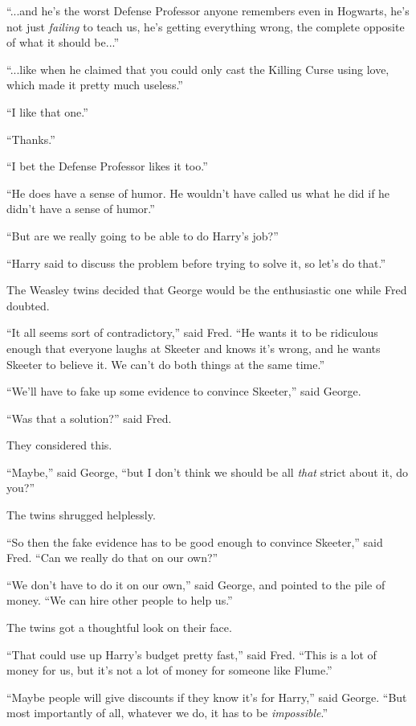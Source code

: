 ``...and he's the worst Defense Professor anyone remembers even in Hogwarts, he's not just \emph{failing} to teach us, he's getting everything wrong, the complete opposite of what it should be...''

``...like when he claimed that you could only cast the Killing Curse using love, which made it pretty much useless.''

``I like that one.''

``Thanks.''

``I bet the Defense Professor likes it too.''

``He does have a sense of humor. He wouldn't have called us what he did if he didn't have a sense of humor.''

``But are we really going to be able to do Harry's job?''

``Harry said to discuss the problem before trying to solve it, so let's do that.''

The Weasley twins decided that George would be the enthusiastic one while Fred doubted.

``It all seems sort of contradictory,'' said Fred. ``He wants it to be ridiculous enough that everyone laughs at Skeeter and knows it's wrong, and he wants Skeeter to believe it. We can't do both things at the same time.''

``We'll have to fake up some evidence to convince Skeeter,'' said George.

``Was that a solution?'' said Fred.

They considered this.

``Maybe,'' said George, ``but I don't think we should be all \emph{that} strict about it, do you?''

The twins shrugged helplessly.

``So then the fake evidence has to be good enough to convince Skeeter,'' said Fred. ``Can we really do that on our own?''

``We don't have to do it on our own,'' said George, and pointed to the pile of money. ``We can hire other people to help us.''

The twins got a thoughtful look on their face.

``That could use up Harry's budget pretty fast,'' said Fred. ``This is a lot of money for us, but it's not a lot of money for someone like Flume.''

``Maybe people will give discounts if they know it's for Harry,'' said George. ``But most importantly of all, whatever we do, it has to be \emph{impossible}.''

